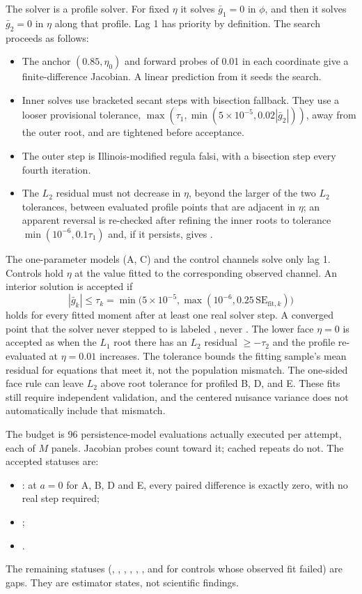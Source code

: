 The solver is a profile solver. For fixed $\eta$ it solves $\bar g_1=0$ in $\phi$, and then it solves $\bar g_2=0$ in $\eta$ along that profile. Lag 1 has priority by definition. The search proceeds as follows:
\begin{itemize}
\item The anchor $(0.85,\eta_0)$ and forward probes of 0.01 in each coordinate give a finite-difference Jacobian. A linear prediction from it seeds the search.
\item Inner solves use bracketed secant steps with bisection fallback. They use a looser provisional tolerance, $\max(\tau_1,\min(5\times10^{-5},0.02|\bar g_2|))$, away from the outer root, and are tightened before acceptance.
\item The outer step is Illinois-modified regula falsi, with a bisection step every fourth iteration.
\item The $L_2$ residual must not decrease in $\eta$, beyond the larger of the two $L_2$ tolerances, between evaluated profile points that are adjacent in $\eta$; an apparent reversal is re-checked after refining the inner roots to tolerance $\min(10^{-6},0.1\tau_1)$ and, if it persists, gives .
\end{itemize}
The one-parameter models (A, C) and the control channels solve only lag 1. Controls hold $\eta$ at the value fitted to the corresponding observed channel. An interior solution is accepted if
\begin{equation*}
|\bar g_k|\le\tau_k=\min\!\bigl(5\times10^{-5},\max(10^{-6},0.25\,\mathrm{SE}_{\mathrm{fit},k})\bigr)
\end{equation*}
holds for every fitted moment after at least one real solver step. A converged point that the solver never stepped to is labeled , never . The lower face $\eta=0$ is accepted as  when the $L_1$ root there has an $L_2$ residual $\ge-\tau_2$ and the profile re-evaluated at $\eta=0.01$ increases.
The tolerance bounds the fitting sample's mean residual for equations that meet it, not the population mismatch. The one-sided face rule can leave $L_2$ above root tolerance for profiled B, D, and E. These fits still require independent validation, and the centered nuisance variance does not automatically include that mismatch. %

The budget is 96 persistence-model evaluations actually executed per attempt, each of $M$ panels. Jacobian probes count toward it; cached repeats do not. The accepted statuses are:
\begin{itemize}
\item {}: at $a=0$ for A, B, D and E, every paired difference is exactly zero, with no real step required;
\item {};
\item {}.
\end{itemize}
The remaining statuses (, , , , , , and  for controls whose observed fit failed) are gaps. They are estimator states, not scientific findings.

